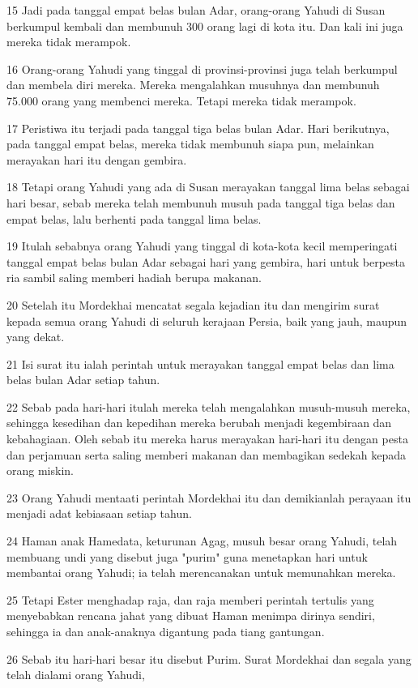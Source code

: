 \par 15 Jadi pada tanggal empat belas bulan Adar, orang-orang Yahudi di Susan berkumpul kembali dan membunuh 300 orang lagi di kota itu. Dan kali ini juga mereka tidak merampok.
\par 16 Orang-orang Yahudi yang tinggal di provinsi-provinsi juga telah berkumpul dan membela diri mereka. Mereka mengalahkan musuhnya dan membunuh 75.000 orang yang membenci mereka. Tetapi mereka tidak merampok.
\par 17 Peristiwa itu terjadi pada tanggal tiga belas bulan Adar. Hari berikutnya, pada tanggal empat belas, mereka tidak membunuh siapa pun, melainkan merayakan hari itu dengan gembira.
\par 18 Tetapi orang Yahudi yang ada di Susan merayakan tanggal lima belas sebagai hari besar, sebab mereka telah membunuh musuh pada tanggal tiga belas dan empat belas, lalu berhenti pada tanggal lima belas.
\par 19 Itulah sebabnya orang Yahudi yang tinggal di kota-kota kecil memperingati tanggal empat belas bulan Adar sebagai hari yang gembira, hari untuk berpesta ria sambil saling memberi hadiah berupa makanan.
\par 20 Setelah itu Mordekhai mencatat segala kejadian itu dan mengirim surat kepada semua orang Yahudi di seluruh kerajaan Persia, baik yang jauh, maupun yang dekat.
\par 21 Isi surat itu ialah perintah untuk merayakan tanggal empat belas dan lima belas bulan Adar setiap tahun.
\par 22 Sebab pada hari-hari itulah mereka telah mengalahkan musuh-musuh mereka, sehingga kesedihan dan kepedihan mereka berubah menjadi kegembiraan dan kebahagiaan. Oleh sebab itu mereka harus merayakan hari-hari itu dengan pesta dan perjamuan serta saling memberi makanan dan membagikan sedekah kepada orang miskin.
\par 23 Orang Yahudi mentaati perintah Mordekhai itu dan demikianlah perayaan itu menjadi adat kebiasaan setiap tahun.
\par 24 Haman anak Hamedata, keturunan Agag, musuh besar orang Yahudi, telah membuang undi yang disebut juga "purim" guna menetapkan hari untuk membantai orang Yahudi; ia telah merencanakan untuk memunahkan mereka.
\par 25 Tetapi Ester menghadap raja, dan raja memberi perintah tertulis yang menyebabkan rencana jahat yang dibuat Haman menimpa dirinya sendiri, sehingga ia dan anak-anaknya digantung pada tiang gantungan.
\par 26 Sebab itu hari-hari besar itu disebut Purim. Surat Mordekhai dan segala yang telah dialami orang Yahudi,
